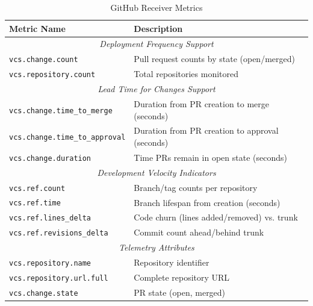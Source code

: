 \documentclass[12pt]{article}
\begin{document}
\begin{table}[htbp]
	\centering
	\caption{GitHub Receiver Metrics}
	\label{tab:metrics}
	\small
	\begin{tabular}{|p{6cm}|p{9cm}|}
		\hline
		\textbf{Metric Name}                   & \textbf{Description}                            \\
		\hline
		\multicolumn{2}{|c|}{\textit{Deployment Frequency Support}}                              \\
		\hline
		\texttt{vcs.change.count}              & Pull request counts by state (open/merged)      \\
		\hline
		\texttt{vcs.repository.count}          & Total repositories monitored                    \\
		\hline
		\multicolumn{2}{|c|}{\textit{Lead Time for Changes Support}}                             \\
		\hline
		\texttt{vcs.change.time\_to\_merge}    & Duration from PR creation to merge (seconds)    \\
		\hline
		\texttt{vcs.change.time\_to\_approval} & Duration from PR creation to approval (seconds) \\
		\hline
		\texttt{vcs.change.duration}           & Time PRs remain in open state (seconds)         \\
		\hline
		\multicolumn{2}{|c|}{\textit{Development Velocity Indicators}}                           \\
		\hline
		\texttt{vcs.ref.count}                 & Branch/tag counts per repository                \\
		\hline
		\texttt{vcs.ref.time}                  & Branch lifespan from creation (seconds)         \\
		\hline
		\texttt{vcs.ref.lines\_delta}          & Code churn (lines added/removed) vs. trunk      \\
		\hline
		\texttt{vcs.ref.revisions\_delta}      & Commit count ahead/behind trunk                 \\
		\hline
		\multicolumn{2}{|c|}{\textit{Telemetry Attributes}}                                      \\
		\hline
		\texttt{vcs.repository.name}           & Repository identifier                           \\
		\hline
		\texttt{vcs.repository.url.full}       & Complete repository URL                         \\
		\hline
		\texttt{vcs.change.state}              & PR state (open, merged)                         \\

\end{tabular}
\end{table}
\end{document}
